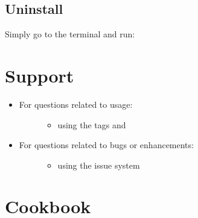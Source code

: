 \documentclass[letterpaper,10pt,english]{sphinxmanual}
\begin{document}
\section{Uninstall}
\label{\detokenize{install:uninstall}}
Simply go to the terminal and run:

%
\begin{sphinxVerbatim}[commandchars=\\\{\}]
  
\end{sphinxVerbatim}


\chapter{Support}
\label{\detokenize{support:support}}\label{\detokenize{support::doc}}\begin{itemize}
\item {} \begin{description}
\item[{For questions related to usage:}] \leavevmode\begin{itemize}
\item {} 
 using the tags  and 

\end{itemize}

\end{description}

\item {} \begin{description}
\item[{For questions related to bugs or enhancements:}] \leavevmode\begin{itemize}
\item {} 
 using the issue system

\end{itemize}

\end{description}

\end{itemize}


\chapter{Cookbook}
\label{\detokenize{cookbook:github}}\label{\detokenize{cookbook::doc}}\label{\detokenize{cookbook:cookbook}}
\end{document}
